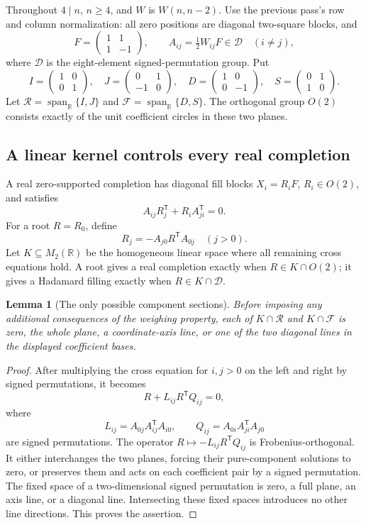\documentclass[11pt]{article}
\newtheorem{lemma}[theorem]{Lemma}
\begin{document}
Throughout $4\mid n$, $n\ge4$, and $W$ is $W(n,n-2)$. Use the
previous pass's row and column normalization: all zero positions
are diagonal two-square blocks, and
\[
 F=\begin{pmatrix}1&1\\1&-1\end{pmatrix},\qquad
 A_{ij}=\tfrac12W_{ij}F\in\mathcal D\quad(i\ne j),
\]
where $\mathcal D$ is the eight-element signed-permutation group.
Put
\[
 I=\begin{pmatrix}1&0\\0&1\end{pmatrix},\quad
 J=\begin{pmatrix}0&1\\-1&0\end{pmatrix},\quad
 D=\begin{pmatrix}1&0\\0&-1\end{pmatrix},\quad
 S=\begin{pmatrix}0&1\\1&0\end{pmatrix}.
\]
Let $\mathcal R=\operatorname{span}_{\mathbb R}\{I,J\}$ and
$\mathcal F=\operatorname{span}_{\mathbb R}\{D,S\}$.
The orthogonal group $O(2)$ consists exactly of the unit coefficient
circles in these two planes.

\subsection{A linear kernel controls every real completion}
A real zero-supported completion has diagonal fill blocks
$X_i=R_iF$, $R_i\in O(2)$, and satisfies
\[
 A_{ij}R_j^{\mathsf T}+R_iA_{ji}^{\mathsf T}=0.
\]
For a root $R=R_0$, define
\[
 R_j=-A_{j0}R^{\mathsf T}A_{0j}\quad(j>0).
\]
Let $K\subseteq M_2(\mathbb R)$ be the homogeneous linear space
where all remaining cross equations hold. A root gives a real
completion exactly when $R\in K\cap O(2)$; it gives a Hadamard
filling exactly when $R\in K\cap\mathcal D$.

\begin{lemma}[The only possible component sections]
Before imposing any additional consequences of the weighing
property, each of $K\cap\mathcal R$ and $K\cap\mathcal F$ is zero,
the whole plane, a coordinate-axis line, or one of the two diagonal
lines in the displayed coefficient bases.
\end{lemma}
\begin{proof}
After multiplying the cross equation for $i,j>0$ on the left and
right by signed permutations, it becomes
\[
 R+L_{ij}R^{\mathsf T}Q_{ij}=0,
\]
where
\[
 L_{ij}=A_{0j}A_{ij}^{\mathsf T}A_{i0},\qquad
 Q_{ij}=A_{0i}A_{ji}^{\mathsf T}A_{j0}
\]
are signed permutations. The operator
$R\mapsto-L_{ij}R^{\mathsf T}Q_{ij}$ is Frobenius-orthogonal.
It either interchanges the two planes, forcing their pure-component
solutions to zero, or preserves them and acts on each coefficient
pair by a signed permutation. The fixed space of a two-dimensional
signed permutation is zero, a full plane, an axis line, or a
diagonal line. Intersecting these fixed spaces introduces no other
line directions. This proves the assertion.
\end{proof}
\end{document}
